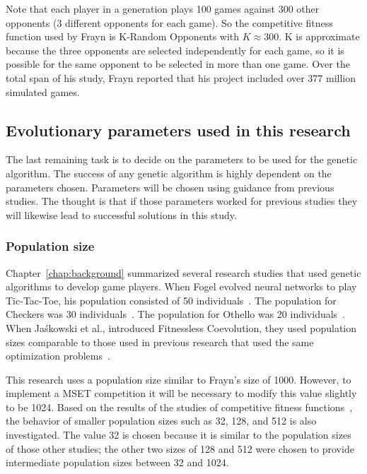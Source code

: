 Note that each player in a generation plays 100 games against 300 other
opponents (3 different opponents for each game). So the competitive fitness
function used by Frayn is K-Random Opponents with \(K\approx300\). K is
approximate because the three opponents are selected independently for each
game, so it is possible for the same opponent to be selected in more than one
game. Over the total span of his study, Frayn reported that his project included
over 377 million simulated games.

\subsection{Evolutionary parameters used in this research}

The last remaining task is to decide on the parameters to be used for the
genetic algorithm. The success of any genetic algorithm is highly dependent on
the parameters chosen. Parameters will be chosen using guidance from previous
studies. The thought is that if those parameters worked for previous studies
they will likewise lead to successful solutions in this study.

\subsubsection{Population size}

Chapter~\ref{chap:background} summarized several research studies that used
genetic algorithms to develop game players. When Fogel evolved neural networks
to play Tic-Tac-Toe, his population consisted of 50
individuals~\cite{Fogel1993}. The population for Checkers was 30
individuals~\cite{Fogel2000Anaconda,journals/tec/ChellapillaF01}.
The population for Othello was 20 individuals~\cite{ChongTW05}. When
Ja\'{s}kowski et al., introduced Fitnessless Coevolution, they used population
sizes comparable to those used in previous research that used the same
optimization problems~\cite{Jaskowski:2008:FC:1389095.1389161}.

This research uses a population size similar to Frayn's size of 1000. However,
to implement a MSET competition it will be necessary to modify this value
slightly to be 1024. Based on the results of the studies of competitive fitness
functions~\cite{Angeline:1993:CEE:645513.657590, Panait02acomparative,
Jaskowski:2008:FC:1389095.1389161}, the behavior of smaller population sizes
such as 32, 128, and 512 is also investigated. The value 32 is chosen because it
is similar to the population sizes of those other studies; the other two sizes
of 128 and 512 were chosen to provide intermediate population sizes between 32
and 1024.

